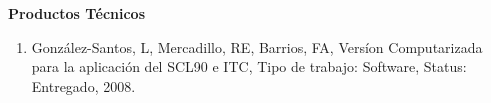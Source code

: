 \textbf{Productos Técnicos}

\hfill

\begin{enumerate}

\item  González-Santos, L, Mercadillo, RE, Barrios, FA, Versíon Computarizada para la aplicación del SCL90 e ITC, Tipo de
trabajo: Software, Status: Entregado, 2008.

\end{enumerate}
